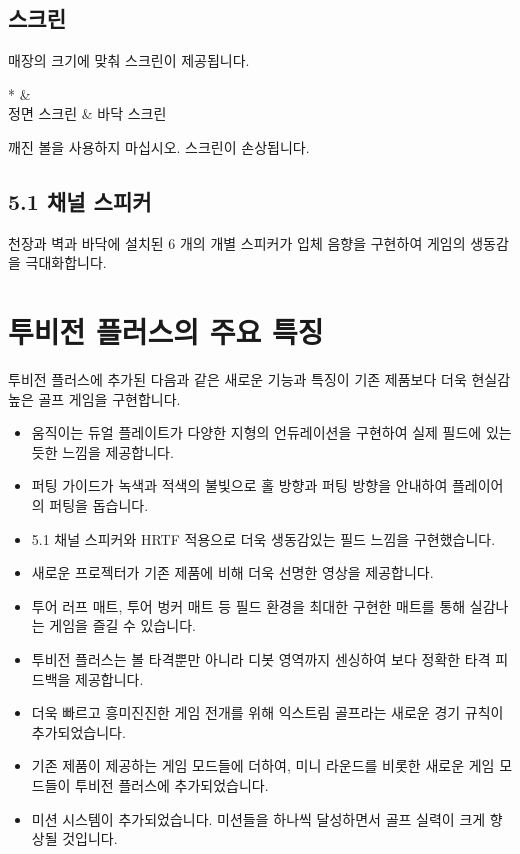 \documentclass[10pt, openright, language=korean]{hzguide}
\begin{document}
\newpage
\subsection{스크린}

매장의 크기에 맞춰 스크린이 제공됩니다. 

\begin{ImageTable}*
 &   \\
정면 스크린 & 바닥 스크린 \\
\end{ImageTable}

\begin{Caution}
깨진 볼을 사용하지 마십시오. 스크린이 손상됩니다.
\end{Caution}

\subsection{5.1 채널 스피커}

천장과 벽과 바닥에 설치된 6 개의 개별 스피커가 입체 음향을 구현하여 게임의 생동감을 극대화합니다.


\newpage
\section{투비전 플러스의 주요 특징}

투비전 플러스에 추가된 다음과 같은 새로운 기능과 특징이 기존 제품보다 더욱 현실감 높은 골프 게임을 구현합니다.

\begin{itemize}
\item 움직이는 듀얼 플레이트가 다양한 지형의 언듀레이션을 구현하여 실제 필드에 있는 듯한 느낌을 제공합니다.
\item 퍼팅 가이드가 녹색과 적색의 불빛으로 홀 방향과 퍼팅 방향을 안내하여 플레이어의 퍼팅을 돕습니다.
\item 5.1 채널 스피커와 HRTF 적용으로 더욱 생동감있는 필드 느낌을 구현했습니다.
\item 새로운 프로젝터가 기존 제품에 비해 더욱 선명한 영상을 제공합니다.
\item 투어 러프 매트, 투어 벙커 매트 등 필드 환경을 최대한 구현한 매트를 통해 실감나는 게임을 즐길 수 있습니다.
\item 투비전 플러스는 볼 타격뿐만 아니라 디봇 영역까지 센싱하여 보다 정확한 타격 피드백을 제공합니다.
\item 더욱 빠르고 흥미진진한 게임 전개를 위해 익스트림 골프라는 새로운 경기 규칙이 추가되었습니다.
\item 기존 제품이 제공하는 게임 모드들에 더하여, 미니 라운드를 비롯한 새로운 게임 모드들이 투비전 플러스에 추가되었습니다.
\item 미션 시스템이 추가되었습니다. 미션들을 하나씩 달성하면서 골프 실력이 크게 향상될 것입니다.    
\end{itemize}
\end{document}
